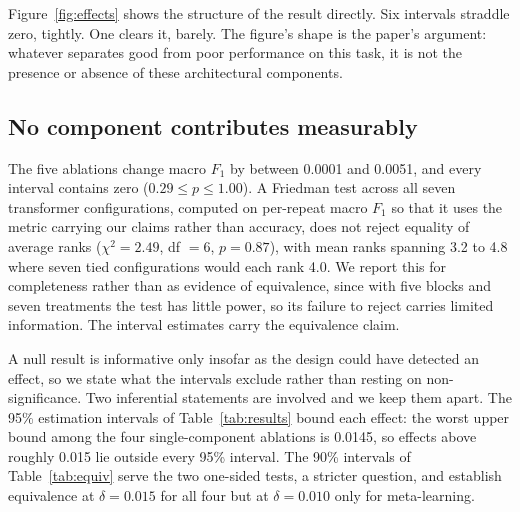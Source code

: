 \documentclass[11pt,a4paper]{article}
\begin{document}
Figure~\ref{fig:effects} shows the structure of the result directly. Six intervals
straddle zero, tightly. One clears it, barely. The figure's shape is the paper's argument:
whatever separates good from poor performance on this task, it is not the presence or
absence of these architectural components.

\subsection{No component contributes measurably}
\label{sec:ablation}

The five ablations change macro $F_1$ by between 0.0001 and 0.0051, and every interval
contains zero ($0.29 \leq p \leq 1.00$). A Friedman test across all seven transformer configurations, computed on per-repeat macro
$F_1$ so that it uses the metric carrying our claims rather than accuracy, does not reject
equality of average ranks ($\chi^2 = 2.49$, df $= 6$, $p = 0.87$), with mean ranks spanning
3.2 to 4.8 where seven tied configurations would each rank 4.0. We report this for completeness rather than as evidence of equivalence, since with five blocks and seven treatments the test has little power, so its failure to reject carries
limited information. The interval estimates carry the equivalence claim.

A null result is informative only insofar as the design could have detected an effect, so we
state what the intervals exclude rather than resting on non-significance. Two inferential statements are involved and we keep them apart. The 95\% estimation intervals
of Table~\ref{tab:results} bound each effect: the worst upper bound among the four
single-component ablations is 0.0145, so effects above roughly 0.015 lie outside every 95\%
interval. The 90\% intervals of Table~\ref{tab:equiv} serve the two one-sided tests, a stricter
question, and establish equivalence at $\delta = 0.015$ for all four but at $\delta = 0.010$
only for meta-learning.
\end{document}
